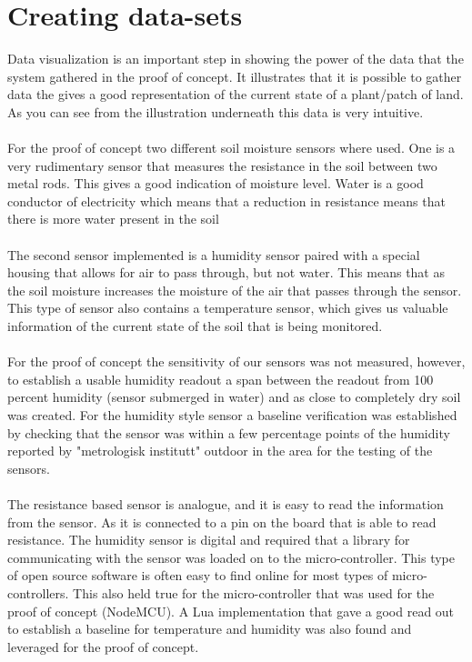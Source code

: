 \documentclass[]{uiophd}
\begin{document}
\section{Creating data-sets}
Data visualization is an important step in showing the power of the data that the system gathered in the proof of concept. It illustrates that it is possible to gather data the gives a good representation of the current state of a plant/patch of land. As you can see from the illustration underneath this data is very intuitive.
\\\\
For the proof of concept two different soil moisture sensors where used. One is a very rudimentary sensor that measures the resistance in the soil between two metal rods. This gives a good indication of moisture level. Water is a good conductor of electricity which means that a reduction in resistance means that there is more water present in the soil
\\\\
The second sensor implemented is a humidity sensor paired with a special housing that allows for air to pass through, but not water. This means that as the soil moisture increases the moisture of the air that passes through the sensor. This type of sensor also contains a temperature sensor, which gives us valuable information of the current state of the soil that is being monitored.
\\\\
For the proof of concept the sensitivity of our sensors was not measured, however, to establish a usable humidity readout a span between the readout from 100 percent humidity (sensor submerged in water) and as close to completely dry soil was created. For the humidity style sensor a baseline verification was established by checking that the sensor was within a few percentage points of the humidity reported by "metrologisk institutt" outdoor in the area for the testing of the sensors.
\\\\
The resistance based sensor is analogue, and it is easy to read the information from the sensor. As it is connected to a pin on the board that is able to read resistance. The humidity sensor is digital and required that a library for communicating with the sensor was loaded on to the micro-controller. This type of open source software is often easy to find online for most types of micro-controllers. This also held true for the micro-controller that was used for the proof of concept (NodeMCU). A Lua implementation that gave a good read out to establish a baseline for temperature and humidity was also found and leveraged for the proof of concept.
\end{document}
